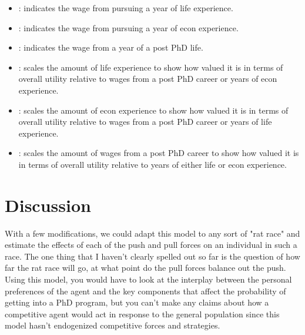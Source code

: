\documentclass[11pt,english]{article}
\begin{document}
\begin{itemize}
\item {}: indicates the wage from pursuing a year of life experience.

\item {}: indicates the wage from pursuing a year of econ experience.

\item {}: indicates the wage from a year of a post PhD life.

\item {}: scales the amount of life experience to show how valued it is in terms of overall utility relative to wages from a post PhD career or years of econ experience.

\item {}: scales the amount of econ experience to show how valued it is in terms of overall utility relative to wages from a post PhD career or years of life experience.

\item {}: scales the amount of wages from a post PhD career to show how valued it is in terms of overall utility relative to years of either life or econ experience.
\end{itemize}

\section*{Discussion}

With a few modifications, we could adapt this model to any sort of "rat race" and estimate the effects of each of the push and pull forces on an individual in such a race. The one thing that I haven't clearly spelled out so far is the question of how far the rat race will go, at what point do the pull forces balance out the push. Using this model, you would have to look at the interplay between the personal preferences of the agent and the key components that affect the probability of getting into a PhD program, but you can't make any claims about how a competitive agent would act in response to the general population since this model hasn't endogenized competitive forces and strategies.
\end{document}

